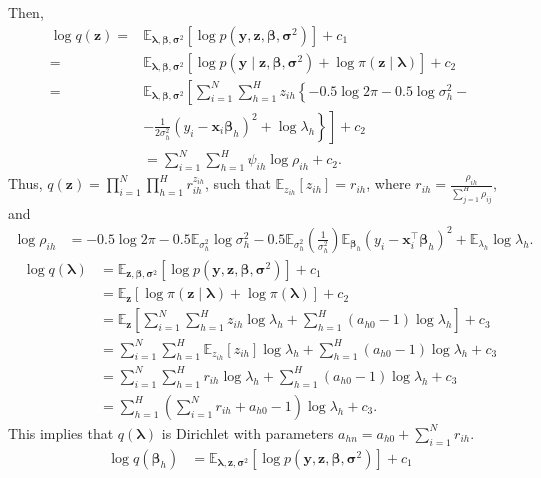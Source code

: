 \begin{enumerate}[leftmargin=*]
Then,
\begin{align*}
	\log q(\bm{z})=&\mathbb{E}_{\bm{\lambda},\bm{\beta},\bm{\sigma}^2}\left[\log p(\bm{y},\bm{z},\bm{\beta},\bm{\sigma}^2)\right] + c_1\\
	=&\mathbb{E}_{\bm{\lambda},\bm{\beta},\bm{\sigma}^2}\left[\log p(\bm{y}\mid\bm{z},\bm{\beta},\bm{\sigma}^2)+\log \pi(\bm{z}\mid\bm{\lambda})\right] + c_2\\
	=&\mathbb{E}_{\bm{\lambda},\bm{\beta},\bm{\sigma}^2}\left[\sum_{i=1}^N\sum_{h=1}^H z_{ih}\left\{-0.5\log 2\pi - 0.5 \log \sigma^2_h - \right.\right.\\
	&\left.\left.-\frac{1}{2\sigma^2_h}(y_i-\bm{x}_i\bm{\beta}_h)^2 + \log\lambda_h\right\}\right] + c_2\\
	&=\sum_{i=1}^N\sum_{h=1}^H\psi_{ih}\log \rho_{ih} + c_2.
\end{align*}
Thus, $q(\bm{z})=\prod_{i=1}^N\prod_{h=1}^H r_{ih}^{z_{ih}}$, such that $\mathbb{E}_{z_{ih}}[z_{ih}]=r_{ih}$, where $r_{ih}=\frac{\rho_{ih}}{\sum_{j=1}^H\rho_{ij}}$, and
\begin{align*}
	\log \rho_{ih}&=-0.5\log 2\pi -0.5\mathbb{E}_{\sigma^2_h} \log \sigma_h^2 - 0.5 \mathbb{E}_{\sigma^2_h}\left(\frac{1}{\sigma^2_h}\right)\mathbb{E}_{\bm{\beta}_h}(y_i-\bm{x}_i^{\top}\bm{\beta}_h)^2 + \mathbb{E}_{\lambda_h}\log \lambda_h.
\end{align*}
\begin{align*}
	\log q(\bm{\lambda})&=\mathbb{E}_{\bm{z},\bm{\beta},\bm{\sigma}^2}\left[\log p(\bm{y},\bm{z},\bm{\beta},\bm{\sigma}^2)\right]+c_1\\
	&=\mathbb{E}_{\bm{z}}\left[\log \pi(\bm{z}\mid \bm{\lambda})+\log \pi(\bm{\lambda})\right]+c_2\\
	&=\mathbb{E}_{\bm{z}}\left[\sum_{i=1}^N\sum_{h=1}^Hz_{ih}\log \lambda_h+\sum_{h=1}^H(a_{h0}-1)\log \lambda_h\right]+c_3\\
	&=\sum_{i=1}^N\sum_{h=1}^H \mathbb{E}_{z_{ih}}[z_{ih}]\log \lambda_h+\sum_{h=1}^H(a_{h0}-1)\log \lambda_h+c_3\\
	&=\sum_{i=1}^N\sum_{h=1}^H r_{ih}\log \lambda_h+\sum_{h=1}^H(a_{h0}-1)\log \lambda_h+c_3\\
	&=\sum_{h=1}^H \left(\sum_{i=1}^Nr_{ih}+a_{h0}-1\right)\log \lambda_h+c_3.
\end{align*}
This implies that $q(\bm{\lambda})$ is Dirichlet with parameters $a_{hn}=a_{h0}+\sum_{i=1}^N r_{ih}$. 
\begin{align*}
	\log q(\bm{\beta}_h)&=\mathbb{E}_{\bm{\lambda},\bm{z},\bm{\sigma}^2}\left[\log p(\bm{y},\bm{z},\bm{\beta},\bm{\sigma}^2)\right] + c_1\\

\end{align*}
\end{enumerate}
